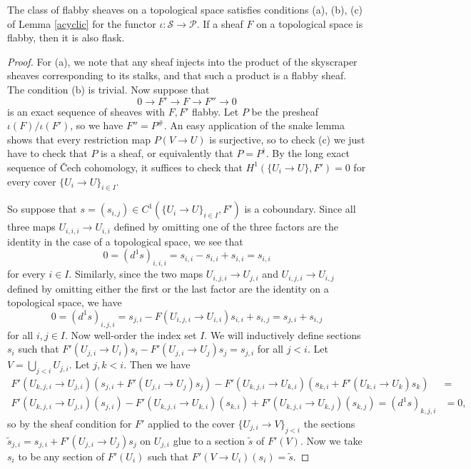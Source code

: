 \begin{prop}\label{flabbyacyclic} The class of flabby sheaves on a topological space satisfies conditions {\rm (a), (b), (c)} of Lemma \ref{acyclic} for the functor $\iota : \mathcal{S} \rightarrow \mathcal{P}$. If a sheaf $F$ on a topological space is flabby, then it is also flask.
\end{prop}
\begin{proof} For (a), we note that any sheaf injects into the product of the skyscraper sheaves corresponding to its stalks, and that such a product is a flabby sheaf. The condition (b) is trivial. Now suppose that
\[
0 \rightarrow F' \rightarrow F \rightarrow F'' \rightarrow 0
\]
is an exact sequence of sheaves with $F, F'$ flabby. Let $P$ be the presheaf $\iota(F)/\iota(F')$, so we have $F'' = P^\#$. An easy application of the snake lemma shows that every restriction map $P(V\rightarrow U)$ is surjective, so to check (c) we just have to check that $P$ is a sheaf, or equivalently that $P=P^\nmid$. By the long exact sequence of \v{C}ech cohomology, it suffices to check that $H^1(\{U_i\rightarrow U\}, F') = 0$ for every cover $\{U_i \rightarrow U\}_{i\in I}$.

So suppose that $s=(s_{i,j}) \in C^1(\{U_i \rightarrow U\}_{i\in I}, F')$ is a coboundary. Since all three maps $U_{i,i,i} \rightarrow U_{i,i}$ defined by omitting one of the three factors are the identity in the case of a topological space, we see that
\[
0 = (d^1s)_{i,i,i} = s_{i,i} - s_{i,i} + s_{i,i} = s_{i,i}
\]
for every $i\in I$. Similarly, since the two maps $U_{i,j,i} \rightarrow U_{j,i}$ and $U_{i,j,i} \rightarrow U_{i,j}$ defined by omitting either the first or the last factor are the identity on a topological space, we have
\[
0 = (d^1s)_{i,j,i} = s_{j,i} - F(U_{i,j,i}\rightarrow U_{i,i})s_{i,i} + s_{i,j} = s_{j,i} + s_{i,j}
\]
for all $i,j\in I$. Now well-order the index set $I$. We will inductively define sections $s_i$ such that $F'(U_{j,i}\rightarrow U_i)s_i - F'(U_{j,i}\rightarrow U_j)s_j = s_{j,i}$ for all $j < i$. Let $V = \bigcup_{j<i} U_{j,i}$. Let $j,k < i$. Then we have
\begin{align*}
F'(U_{k,j,i}\rightarrow U_{j,i})(s_{j,i}+F'(U_{j,i}\rightarrow U_j)s_j) - F'(U_{k,j,i}\rightarrow U_{k,i})(s_{k,i}+F'(U_{k,i}\rightarrow U_k)s_k) &= \\
F'(U_{k,j,i}\rightarrow U_{j,i})(s_{j,i}) - F'(U_{k,j,i}\rightarrow U_{k,i})(s_{k,i}) + F'(U_{k,j,i}\rightarrow U_{k,j})(s_{k,j}) = (d^1s)_{k,j,i} &= 0,
\end{align*}
so by the sheaf condition for $F'$ applied to the cover $\{U_{j,i}\rightarrow V\}_{j<i}$ the sections $\tilde{s}_{j,i} = s_{j,i}+F'(U_{j,i}\rightarrow U_j)s_j$ on $U_{j,i}$ glue to a section $\tilde{s}$ of $F'(V)$. Now we take $s_i$ to be any section of $F'(U_i)$ such that $F'(V\rightarrow U_i)(s_i) = \tilde{s}$.


\end{proof}
